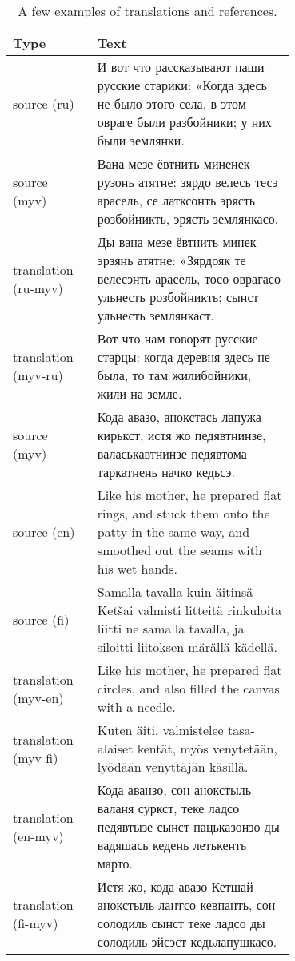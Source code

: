 \documentclass[11pt]{article}
\begin{document}
\begin{table*}[ht!]
\small
\centering
\begin{tabular}{|l|p{0.7\linewidth}|}
\hline
Type                 & Text                                                                                                                                   \\
\hline
source (ru)          & И   вот что рассказывают наши русские старики: «Когда здесь не было этого села, в   этом овраге были разбойники; у них были землянки.  \\
source (myv)         & Вана   мезе ёвтнить миненек рузонь атятне: зярдо велесь тесэ арасель, се латксонть   эрясть розбойникть, эрясть землянкасо.            \\
translation (ru-myv) & Ды   вана мезе ёвтнить минек эрзянь атятне: «Зярдояк те велесэнть арасель, тосо   оврагасо ульнесть розбойникть; сынст ульнесть землянкаст. \\
translation (myv-ru) & Вот что нам говорят русские   старцы: когда деревня здесь не была, то там жилибойники, жили на земле.                                  \\
\hline
source (myv)         & Кода   авазо, анокстась лапужа кирькст, истя жо педявтнинзе, валаськавтнинзе   педявтома таркатнень начко кедьсэ.                      \\
source (en)          & Like his mother, he prepared   flat rings, and stuck them onto the patty in the same way, and smoothed out   the seams with his wet hands.  \\
source (fi)          & Samalla tavalla kuin äitinsä   Ketšai valmisti litteitä rinkuloita liitti ne samalla tavalla, ja siloitti   liitoksen märällä kädellä. \\
translation (myv-en) & Like his mother, he prepared   flat circles, and also filled the canvas with a needle.                                                 \\
translation (myv-fi) & Kuten äiti, valmistelee   tasa-alaiset kentät, myös venytetään, lyödään venyttäjän käsillä.                                            \\
translation (en-myv) & Кода аванзо, сон анокстыль   валаня суркст, теке ладсо педявтызе сынст пацьказонзо ды вадяшась кедень   летькенть марто.               \\
translation (fi-myv) & Истя жо, кода авазо Кетшай   анокстыль лаҥгсо кевпанть, сон солодиль сынст теке ладсо ды солодиль эйсэст   кедьлапушкасо.    \\
\hline
\end{tabular}
\caption{\label{tab:examples} A few examples of translations and references.}
\end{table*}
\end{document}

